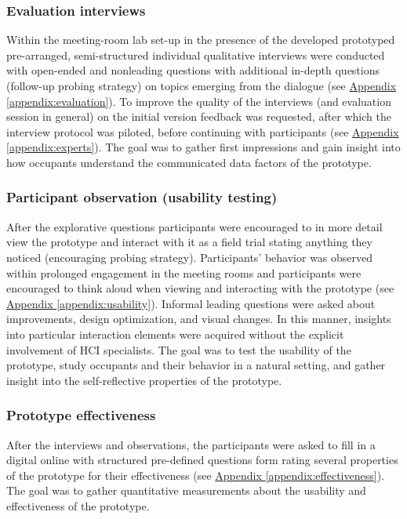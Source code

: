 \subsubsection{Evaluation interviews}

Within the meeting-room lab set-up in the presence of the developed prototyped pre-arranged, semi-structured individual qualitative interviews were conducted with open-ended and nonleading questions with additional in-depth questions (follow-up probing strategy) on topics emerging from the dialogue (see \hyperref[appendix:evaluation]{Appendix \ref*{appendix:evaluation}}). To improve the quality of the interviews (and evaluation session in general) on the initial version feedback was requested, after which the interview protocol was piloted, before continuing with participants (see \hyperref[appendix:experts]{Appendix \ref*{appendix:experts}}). The goal was to gather first impressions and gain insight into how occupants understand the communicated data factors of the prototype.

\subsubsection{Participant observation (usability testing)}

After the explorative questions participants were encouraged to in more detail view the prototype and interact with it as a field trial stating anything they noticed (encouraging probing strategy). Participants' behavior was observed within prolonged engagement in the meeting rooms and participants were encouraged to think aloud when viewing and interacting with the prototype (see \hyperref[appendix:usability]{Appendix \ref*{appendix:usability}}). Informal leading questions were asked about improvements, design optimization, and visual changes. In this manner, insights into particular interaction elements were acquired without the explicit involvement of HCI specialists. The goal was to test the usability of the prototype, study occupants and their behavior in a natural setting, and gather insight into the self-reflective properties of the prototype. 

\subsubsection{Prototype effectiveness}

After the interviews and observations, the participants were asked to fill in a digital online with structured pre-defined questions form rating several properties of the prototype for their effectiveness (see \hyperref[appendix:effectiveness]{Appendix \ref*{appendix:effectiveness}}). The goal was to gather quantitative measurements about the usability and effectiveness of the prototype.

